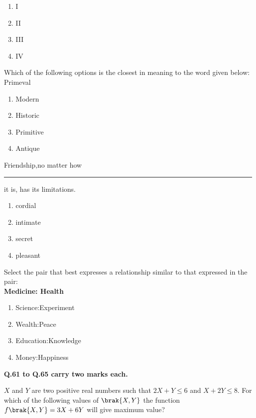 \begin{multicols}{4}
\begin{enumerate}
    \item I
    \item II
    \item III
    \item IV
\end{enumerate}
    
\end{multicols}
\item Which of the following options is the closest in meaning to the word given below:\\
Primeval
\begin{multicols}{2}
\begin{enumerate}
        \item Modern
        \item Historic
        \item Primitive
        \item Antique
    \end{enumerate}
\end{multicols}
\item Friendship,no matter how \rule{1.7cm}{0.2mm} it is, has its limitations.
\begin{enumerate}
    \item cordial
    \item intimate
    \item secret
    \item pleasant
\end{enumerate}
\item Select the pair that best expresses a relationship similar to that expressed in the pair:\\
\textbf{Medicine: Health}
\begin{multicols}{2}
\begin{enumerate}
    \item Science:Experiment
    \item Wealth:Peace
    \item Education:Knowledge
    \item Money:Happiness
\end{enumerate}
\end{multicols}
\textbf{Q.61 to Q.65 carry two marks each.}
\item $X$ and $Y$ are two positive real numbers such that $2X + Y \leq 6$ and $X + 2Y \leq8.$ For which of the following values of $\brak{X,Y}$ the function $f\brak{X,Y} = 3X + 6Y$ will give maximum value?
